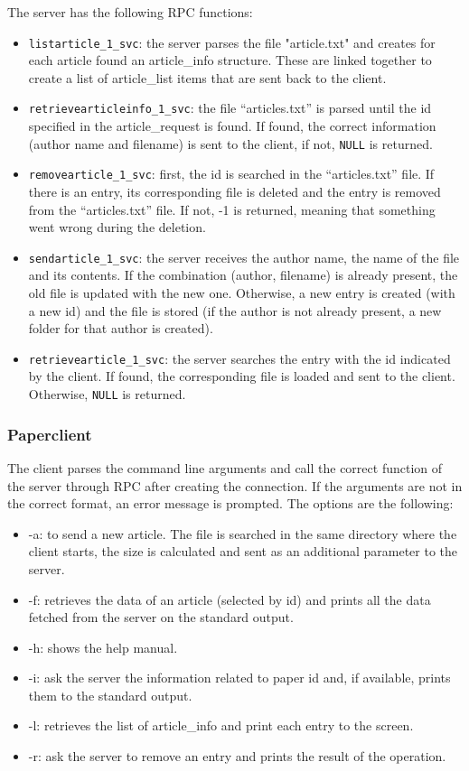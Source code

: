 The server has the following RPC functions:
\begin{itemize}
\item \texttt{listarticle\_1\_svc}: the server parses the file "article.txt" and creates for each article found an article\_info structure. These are linked together to create a list of article\_list items that are sent back to the client.
\item \texttt{retrievearticleinfo\_1\_svc}: the file ``articles.txt'' is parsed until the id specified in the article\_request is found. If found, the correct information (author name and filename) is sent to the client, if not, \texttt{NULL} is returned.
\item \texttt{removearticle\_1\_svc}: first, the id is searched in the ``articles.txt'' file. If there is an entry, its corresponding file is deleted and the entry is removed from the ``articles.txt'' file. If not, -1 is returned, meaning that something went wrong during the deletion.
\item \texttt{sendarticle\_1\_svc}: the server receives the author name, the name of the file and its contents. If the combination (author, filename) is already present, the old file is updated with the new one. Otherwise, a new entry is created (with a new id) and the file is stored (if the author is not already present, a new folder for that author is created).
\item \texttt{retrievearticle\_1\_svc}: the server searches the entry with the id indicated by the client. If found, the corresponding file is loaded and sent to the client. Otherwise, \texttt{NULL} is returned.
\end{itemize}


\subsubsection{Paperclient}
The client parses the command line arguments and call the correct function of the server through RPC after creating the connection. If the arguments are not in the correct format, an error message is prompted. The options are the following:
\begin{itemize}
	\item -a: to send a new article. The file is searched in the same directory where the client starts, the size is calculated and sent as an additional parameter to the server.
	\item -f: retrieves the data of an article (selected by id) and prints all the data fetched from the server on the standard output.
	\item -h: shows the help manual.
	\item -i: ask the server the information related to paper id and, if available, prints them to the standard output.
	\item -l: retrieves the list of article\_info and print each entry to the screen.
	\item -r: ask the server to remove an entry and prints the result of the operation.
\end{itemize}

